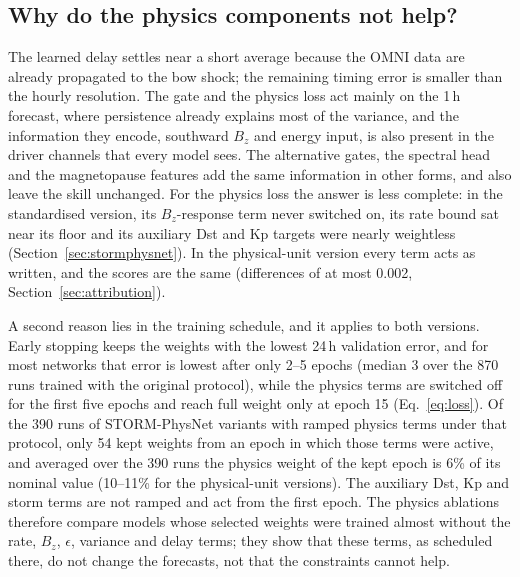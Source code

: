 \documentclass[a4paper,fleqn]{cas-dc}
\begin{document}
\subsection{Why do the physics components not help?}\label{sec:whyphys}
The learned delay settles near a short average because the OMNI data are already propagated to the bow shock;
the remaining timing error is smaller than the hourly resolution. The gate and the physics loss act mainly on
the 1\,h forecast, where persistence already explains most of the variance, and the information they encode,
southward \(B_z\) and energy input, is also present in the driver channels that every model sees. The
alternative gates, the spectral head and the magnetopause features add the same information in other forms,
and also leave the skill unchanged. For the physics loss the answer is less complete: in the standardised version, its
\(B_z\)-response term never switched on, its rate bound sat near its floor and its auxiliary Dst and Kp targets
were nearly weightless (Section~\ref{sec:stormphysnet}). In the physical-unit version every term acts as
written, and the scores are the same (differences of at most 0.002, Section~\ref{sec:attribution}).

A second reason lies in the training schedule, and it applies to both versions. Early stopping keeps the weights
with the lowest 24\,h validation error, and for most networks that error is lowest after only 2--5 epochs (median 3
over the 870 runs trained with the original protocol), while the physics terms are switched off for the first five epochs and reach full weight
only at epoch 15 (Eq.~\ref{eq:loss}). Of the 390 runs of STORM-PhysNet variants with ramped physics terms under that protocol,
only 54 kept weights from an epoch in which those terms were active, and averaged over the 390 runs the physics
weight of the kept epoch is 6\% of its nominal value (10--11\% for the physical-unit versions). The auxiliary Dst,
Kp and storm terms are not ramped and act from the first epoch. The physics ablations therefore compare models whose
selected weights were trained almost without the rate, \(B_z\), \(\epsilon\), variance and delay terms; they show
that these terms, as scheduled there, do not change the forecasts, not that the constraints cannot help.
\end{document}
